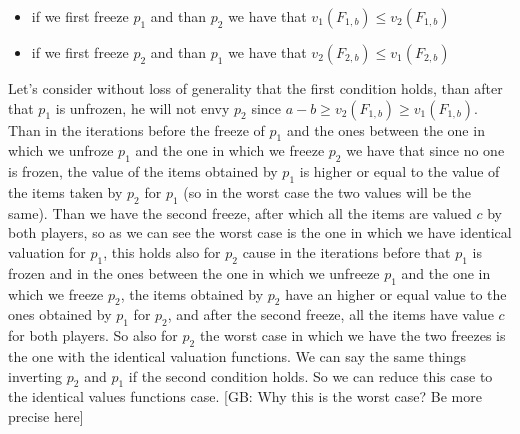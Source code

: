 \documentclass{article}
\newcommand{\gb}[1]{{\color{red}[GB: #1]}}
\begin{document}
\begin{itemize}
    \item if we first freeze $p_1$ and than $p_2$ we have that $v_1(F_{1,b})\le v_2(F_{1,b})$
    \item if we first freeze $p_2$ and than $p_1$ we have that $v_2(F_{2,b})\le v_1(F_{2,b})$
\end{itemize}
Let's consider without loss of generality that the first condition holds, than after that $p_1$ is unfrozen, he will not envy $p_2$ since $a-b\ge v_2(F_{1,b}) \ge v_1(F_{1,b})$. Than in the iterations before the freeze of $p_1$  and the ones between the one in which we unfroze $p_1$ and the one in which we freeze $p_2$ we have that since no one is frozen, the value of the items obtained by $p_1$ is higher or equal to the value of the items taken by $p_2$ for $p_1$ (so in the worst case the two values will be the same). Than we have the second freeze, after which all the items are valued $c$ by both players, so as we can see the worst case is the one in which we have identical valuation for $p_1$, this holds also for $p_2$ cause in the iterations before that $p_1$ is frozen and in the ones between the one in which we unfreeze $p_1$ and the one in which we freeze $p_2$, the items obtained by $p_2$ have an higher or equal value to the ones obtained by $p_1$ for $p_2$, and after the second freeze, all the items have value $c$ for both players. So also for $p_2$ the worst case in which we have the two freezes is the one with the identical valuation functions.
We can say the same things inverting $p_2$ and $p_1$ if the second condition holds. So we can reduce this case to the identical values functions case.
\gb{Why this is the worst case? Be more precise here}\\
\end{document}
